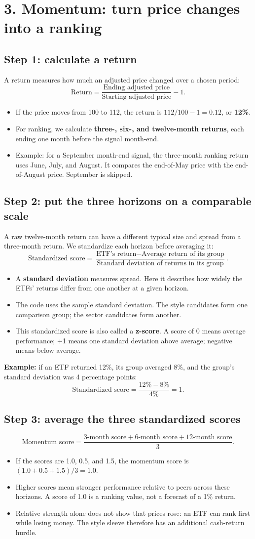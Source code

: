 \documentclass[11pt,letterpaper]{article}
\newcommand{\topic}[1]{\Needspace{5\baselineskip}\subsection*{#1}}
\newcommand{\word}[1]{\text{#1}}
\newcommand{\guidepage}[1]{\clearpage\section*{#1}}
\begin{document}
\guidepage{3. Momentum: turn price changes into a ranking}
\topic{Step 1: calculate a return}
A return measures how much an adjusted price changed over a chosen period:
\[
\word{Return}=\frac{\word{Ending adjusted price}}{\word{Starting adjusted price}}-1.
\]
\begin{itemize}
\item If the price moves from 100 to 112, the return is $112/100-1=0.12$, or \textbf{12\%}.
\item For ranking, we calculate \textbf{three-, six-, and twelve-month returns}, each ending one month before the signal month-end.
\item Example: for a September month-end signal, the three-month ranking return uses June, July, and August. It compares the end-of-May price with the end-of-August price. September is skipped.
\end{itemize}

\topic{Step 2: put the three horizons on a comparable scale}
A raw twelve-month return can have a different typical size and spread from a three-month return. We standardize each horizon before averaging it:
\[
\word{Standardized score}
=\frac{\word{ETF's return}-\word{Average return of its group}}
{\word{Standard deviation of returns in its group}}.
\]
\begin{itemize}
\item A \textbf{standard deviation} measures spread. Here it describes how widely the ETFs' returns differ from one another at a given horizon.
\item The code uses the sample standard deviation. The style candidates form one comparison group; the sector candidates form another.
\item This standardized score is also called a \textbf{z-score}. A score of 0 means average performance; +1 means one standard deviation above average; negative means below average.
\end{itemize}
\textbf{Example:} if an ETF returned 12\%, its group averaged 8\%, and the group's standard deviation was 4 percentage points:
\[
\word{Standardized score}=\frac{12\%-8\%}{4\%}=1.
\]

\topic{Step 3: average the three standardized scores}
\[
\word{Momentum score}
=\frac{\word{3-month score}+\word{6-month score}+\word{12-month score}}{3}.
\]
\begin{itemize}
\item If the scores are 1.0, 0.5, and 1.5, the momentum score is $(1.0+0.5+1.5)/3=1.0$.
\item Higher scores mean stronger performance relative to peers across these horizons. A score of 1.0 is a ranking value, not a forecast of a 1\% return.
\item Relative strength alone does not show that prices rose: an ETF can rank first while losing money. The style sleeve therefore has an additional cash-return hurdle.
\end{itemize}
\end{document}
